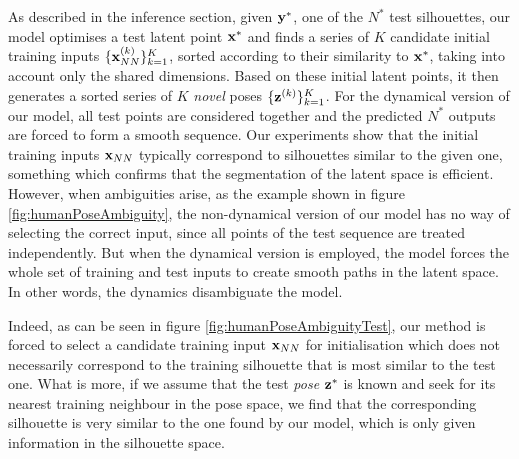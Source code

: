 As described in the inference section, given $\mathbf{y}^*$, one of the
$N^*$ test silhouettes, our model optimises a test latent point
$\mathbf{x}^*$ and finds a series of $K$ candidate initial training inputs $
\{ \mathbf{x}_{NN}^{(k)} \}_{k=1}^K$, sorted according to their similarity
to $\mathbf{x}^*$, taking into account only the shared dimensions.  Based on
these initial latent points, it then generates a sorted series of $K$ \emph{novel}
poses $\{ \mathbf{z}^{(k)} \}_{k=1}^K$. For the dynamical version of our
model, all test points are considered together and the predicted
$N^*$ outputs are forced to form a smooth sequence.  Our experiments
show that the initial training inputs $\mathbf{x}_{NN}$ typically
correspond to silhouettes similar to the given one, something which
confirms that the segmentation of the latent space is
efficient. However, when ambiguities arise, as the example shown in
figure \ref{fig:humanPoseAmbiguity}, the non-dynamical version of our
model has no way of selecting the correct input, since all points of the
test sequence are treated independently. But when the dynamical
version is employed, the model forces the whole set of training and
test inputs to create smooth paths in the latent space.
 In other words, the dynamics disambiguate the model.  
%


 Indeed, as can be seen in figure \ref{fig:humanPoseAmbiguityTest},
 our method is forced to select a candidate training input $\mathbf{x}_{NN}$
 for initialisation which does not necessarily correspond to the
 training silhouette that is most similar to the test one.
%
%
 What is more, if we assume that the test \emph{pose} $\mathbf{z}^*$ is
 known and seek for its nearest training neighbour in the pose space,
 we find that the corresponding silhouette is very similar to the one
 found by our model, which is only given information in the silhouette
 space.

